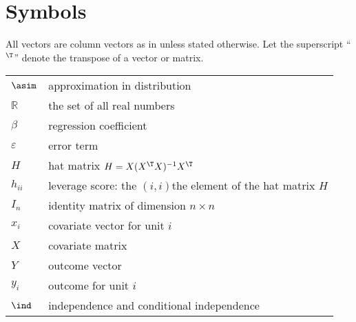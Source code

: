 \chapter*{Symbols}


All vectors are column vectors as in   unless stated otherwise. Let the superscript ``$^{\T}$''
denote the transpose of a vector or matrix. 


\begin{tabular}{ll}
$\asim$ & approximation in distribution \\
$\mathbb{R}$ & the set of all real numbers \\ 
$\beta$ & regression coefficient\\
$\varepsilon$ & error term\\ 
$H$ & hat matrix $H = X(X^{\T}X)^{-1}X^{\T}$\\ 
$h_{ii}$ & leverage score: the $(i, i)$the element of the hat matrix $H$\\
$I_n$ & identity matrix of dimension $n\times n$\\ 
$x_i$ & covariate vector for unit $i$ \\
$X$ & covariate matrix \\
$Y$ & outcome vector \\
$y_i$ & outcome for unit $i$\\
$\ind$& independence and conditional independence
\end{tabular}